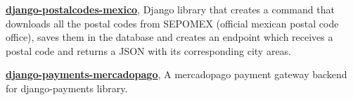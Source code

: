 

\begin{cvpubs}

  \cvpub
    {
      \begin{cvlist}
        \item {\textbf{\href{https://pypi.org/project/django-postalcodes-mexico/}{django-postalcodes-mexico}}, Django library that creates a command that downloads all the postal codes from SEPOMEX (official mexican postal code office), saves them in the database and creates an endpoint which receives a postal code and returns a JSON with its corresponding city areas.}
        \item {\textbf{\href{https://pypi.org/project/django-payments-mercadopago/}{django-payments-mercadopago}}, A mercadopago payment gateway backend for django-payments library. }
      \end{cvlist}
    }
\vspace{-15pt}
\end{cvpubs}
